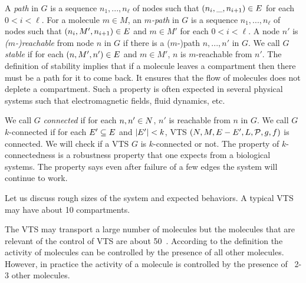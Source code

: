 %

\vspace{0.2cm}
\noindent
A {\em path} in $G$ is a sequence $n_1,...,n_\ell$ of nodes 
such that $(n_i,\_,n_{i+1}) \in E$ for each $ 0 < i < \ell$.
%
For a molecule $m \in M$,
an {\em $m$-path} in $G$ is a sequence $n_1,...,n_\ell$ of nodes 
such that $(n_i,M',n_{i+1}) \in E$ and $m \in M'$ for
each $ 0 < i < \ell$.
%
A node $n'$ is {\em ($m$-)reachable} from node $n$ in $G$ if there is a ($m$-)path
$n,...,n'$ in $G$.
%
%
We call $G$ {\em stable} if for each $(n,M',n') \in E$ and $m \in M'$,
$n$ is $m$-reachable from $n'$.
%
The definition of stability implies that if a molecule leaves a
compartment then there must be a path for it to come back.
%
It ensures that the flow of molecules does not deplete a
compartment.
%
Such a property is often expected in several physical systems
such that electromagnetic fields, fluid dynamics, etc.

%
We call $G$ {\em connected} if for each $n,n' \in N$,
$n'$ is reachable from $n$ in $G$.
%
We call $G$ $k$-connected if for each $E' \subseteq E$ and
$|E'| < k$, VTS
$(N,M,E-E',L,\mathcal{P},g,f)$ is connected.
%
We will check if a VTS $G$ is $k$-connected or not.
%
The property of $k$-connectedness is a robustness property that one
expects from a biological systems.
%
The property says even after failure of a few edges the system will continue to work.

Let us discuss rough sizes of the system and expected behaviors.
%
A typical VTS may have about 10 compartments.
%

The VTS may transport a large number of molecules but the molecules that
are  relevant of the control of VTS are about 50~\cite{kloepper2007elaborate}.
%
According to the definition the activity of molecules can be controlled by
the presence of all other molecules.
%
However, in practice the activity of a molecule is controlled by
the presence of ~2-3 other molecules.

